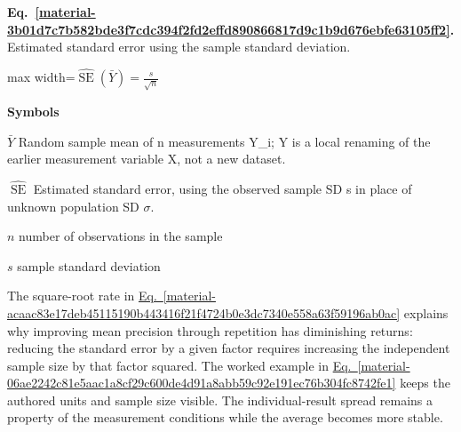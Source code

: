 \documentclass[11pt,a4paper]{article}
\begin{document}
\par\medskip
\begin{samepage}
\label{material-3b01d7c7b582bde3f7cdc394f2fd2effd890866817d9c1b9d676ebfe63105ff2}
\noindent\textbf{Eq.~\ref*{material-3b01d7c7b582bde3f7cdc394f2fd2effd890866817d9c1b9d676ebfe63105ff2}.} Estimated standard error using the sample standard deviation.\par\nopagebreak
\begin{center}\begin{adjustbox}{max width=\linewidth}$\displaystyle \widehat{\operatorname{SE}}(\bar Y)=\frac{s}{\sqrt n}$\end{adjustbox}\end{center}

\par\noindent\textbf{Symbols}

\par\noindent\textbf{\(\bar Y\)} Random sample mean of n measurements Y\_i; Y is a local renaming of the earlier measurement variable X, not a new dataset.

\par\noindent\textbf{\(\widehat{\operatorname{SE}}\)} Estimated standard error, using the observed sample SD s in place of unknown population SD \ensuremath{\sigma}.

\par\noindent\textbf{\(n\)} number of observations in the sample

\par\noindent\textbf{\(s\)} sample standard deviation

\end{samepage}
\medskip

The square-root rate in \hyperref[material-acaac83e17deb45115190b443416f21f4724b0e3dc7340e558a63f59196ab0ac]{Eq.~\ref*{material-acaac83e17deb45115190b443416f21f4724b0e3dc7340e558a63f59196ab0ac}} explains why improving mean precision through repetition has diminishing returns: reducing the standard error by a given factor requires increasing the independent sample size by that factor squared. The worked example in \hyperref[material-06ae2242c81e5aac1a8cf29c600de4d91a8abb59c92e191ec76b304fc8742fe1]{Eq.~\ref*{material-06ae2242c81e5aac1a8cf29c600de4d91a8abb59c92e191ec76b304fc8742fe1}} keeps the authored units and sample size visible. The individual-result spread remains a property of the measurement conditions while the average becomes more stable.
\end{document}
